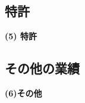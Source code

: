 \subsection{特許}
	\noindent
	{\bf (5) 特許}
{%
}%

\subsection{その他の業績}
	\noindent
	{\bf (6)その他}
{%
}%



\KLAdvancePages


